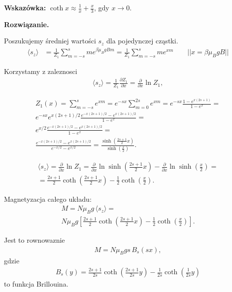 \documentclass[11pt,a4paper]{article}
\newenvironment{solution}{\vspace{1cm} \par\textbf{Rozwiązanie.} \vspace{1cm}}{}
\begin{document}
{\bf Wskazówka:} $\coth x \approx \frac{1}{x}+\frac{x}{3}$, gdy $x \to 0$.

\begin{solution}

Poszukujemy średniej wartości $s_{z}$ dla pojedynczej cząstki.
\begin{align*}
  \langle s_{z} \rangle &= \frac{1}{Z_{1}} \sum_{m=-s}^{s} m e^{\beta \mu_{B} g B m} = 
  \frac{1}{Z_{1}} \sum_{m=-s}^{s} m e^{x m} \qquad || x = \beta \mu_{B} g B ||
\end{align*}

Korzystamy z zaleznosci
\begin{align*}
  \langle s_z \rangle = \frac{1}{Z_1}\frac{\partial Z_1}{\partial x}
  = \frac{\partial}{\partial x}\ln Z_1,
\end{align*}

\begin{align*}
  Z_1(x) = \sum_{m=-s}^{s} e^{xm}
  = e^{-sx}\sum_{m=0}^{2s} e^{xm} = e^{-sx}\frac{1-e^{x(2s+1)}}{1-e^{x}} = \\
  e^{-sx}e^{x(2s+1)/2}\frac{e^{-x(2s+1)/2}-e^{x(2s+1)/2}}{1-e^{x}}  = \\
  e^{x/2}\frac{e^{-x(2s+1)/2}-e^{x(2s+1)/2}}{1-e^{x}} = \\
  \frac{e^{-x(2s+1)/2}-e^{x(2s+1)/2}}{e^{-x/2}-e^{x/2}} =
  \frac{\sinh\!\left(\frac{2s+1}{2}x\right)}{\sinh\!\left(\frac{x}{2}\right)}.
\end{align*}

\begin{align*}
  \langle s_z \rangle = \frac{\partial}{\partial x}\ln Z_1 =
   \frac{\partial}{\partial x}\ln \sinh\!\left(\frac{2s+1}{2}x\right) - \frac{\partial}{\partial x}\ln \sinh\!\left(\frac{x}{2}\right) = \\
  = \frac{2s+1}{2}\coth\!\left(\frac{2s+1}{2}x\right)
   - \frac{1}{2}\coth\!\left(\frac{x}{2}\right).
\end{align*}

Magnetyzacja całego układu:
\begin{align*}
  M = N\mu_B g\,\langle s_z \rangle = \\
      N\mu_B g\left[
    \frac{2s+1}{2}\coth\!\left(\frac{2s+1}{2}x\right)
   - \frac{1}{2}\coth\!\left(\frac{x}{2}\right)
   \right].
\end{align*}

Jest to rownowaznie
\begin{align*}
  M = N\mu_B g s\,B_s(sx),
\end{align*}
gdzie
\begin{align*}
  B_s(y)=\frac{2s+1}{2s}\coth\!\left(\frac{2s+1}{2s}y\right)-\frac{1}{2s}\coth\!\left(\frac{1}{2s}y\right)
\end{align*}
to funkcja Brillouina.


\end{solution}
\end{document}
